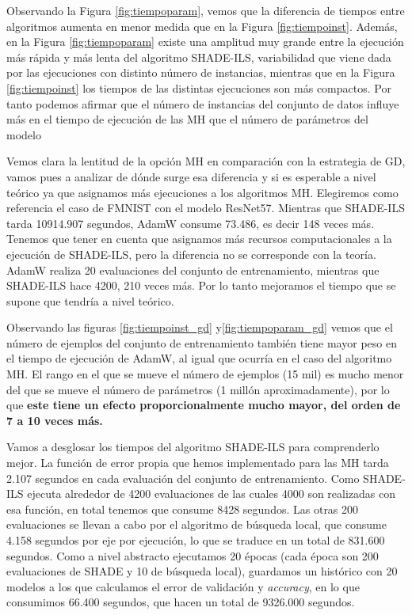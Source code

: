   

Observando la Figura \ref{fig:tiempoparam}, vemos que la diferencia de tiempos entre algoritmos aumenta en menor medida que en la Figura \ref{fig:tiempoinst}. Además, en la Figura \ref{fig:tiempoparam} existe una amplitud muy grande entre la ejecución más rápida y más lenta del algoritmo SHADE-ILS, variabilidad que viene dada por las ejecuciones con distinto número de instancias, mientras que en la Figura \ref{fig:tiempoinst} los tiempos de las distintas ejecuciones son más compactos. Por tanto podemos afirmar que el número de instancias del conjunto de datos influye más en el tiempo de ejecución de las MH que el número de parámetros del modelo

Vemos clara la lentitud de la opción MH en comparación con la estrategia de GD, vamos pues a analizar de dónde surge esa diferencia y si es esperable a nivel teórico ya que asignamos más ejecuciones a los algoritmos MH. Elegiremos como referencia el caso de FMNIST con el modelo ResNet57. Mientras que SHADE-ILS tarda 10914.907 segundos, AdamW consume 73.486, es decir 148 veces más. Tenemos que tener en cuenta que asignamos más recursos computacionales a la ejecución de SHADE-ILS, pero la diferencia no se corresponde con la teoría. AdamW realiza 20 evaluaciones del conjunto de entrenamiento, mientras que SHADE-ILS hace 4200, 210 veces más. Por lo tanto mejoramos el tiempo que se supone que tendría a nivel teórico.

Observando las figuras \ref{fig:tiempoinst_gd} y\ref{fig:tiempoparam_gd} vemos que el número de ejemplos del conjunto de entrenamiento también tiene mayor peso en el tiempo de ejecución de AdamW, al igual que ocurría en el caso del algoritmo MH. El rango en el que se mueve el número de ejemplos (15 mil) es mucho menor del que se mueve el número de parámetros (1 millón aproximadamente), por lo que \textbf{este tiene un efecto proporcionalmente mucho mayor, del orden de 7 a 10 veces más.}


Vamos a desglosar los tiempos del algoritmo SHADE-ILS para comprenderlo mejor. La función de error propia que hemos implementado para las MH tarda 2.107 segundos en cada evaluación del conjunto de entrenamiento. Como SHADE-ILS ejecuta alrededor de 4200 evaluaciones de las cuales 4000 son realizadas con esa función, en total tenemos que consume 8428 segundos. Las otras 200 evaluaciones se llevan a cabo por el algoritmo de búsqueda local, que consume 4.158 segundos por eje por ejecución, lo que se traduce en un total de 831.600 segundos. Como a nivel abstracto ejecutamos 20 épocas (cada época son 200 evaluaciones de SHADE y 10 de búsqueda local), guardamos un histórico con 20 modelos a los que calculamos el error de validación y \textit{accuracy}, en lo que consumimos 66.400 segundos, que hacen un total de 9326.000 segundos. 

